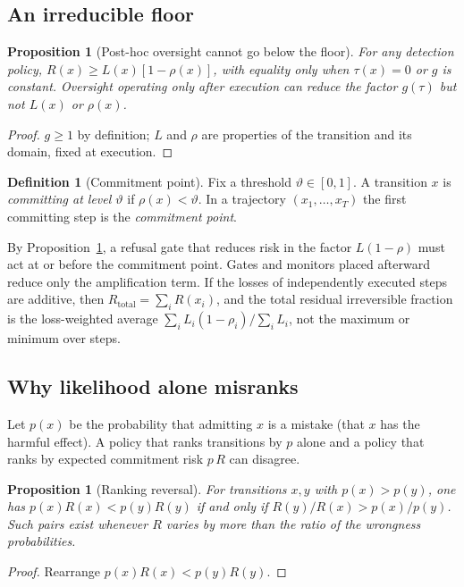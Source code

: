 \documentclass[11pt]{article}
\newtheorem{proposition}[theorem]{Proposition}
\theoremstyle{definition}
\newtheorem{definition}[theorem]{Definition}
\begin{document}
\subsection{An irreducible floor}

\begin{proposition}[Post-hoc oversight cannot go below the floor]\label{prop:D2}
For any detection policy, $R(x)\ge L(x)[1-\rho(x)]$, with equality only when $\tau(x)=0$ or $g$ is constant. Oversight operating only after execution can reduce the factor $g(\tau)$ but not $L(x)$ or $\rho(x)$.
\end{proposition}
\begin{proof}
$g\ge1$ by definition; $L$ and $\rho$ are properties of the transition and its domain, fixed at execution.
\end{proof}

\begin{definition}[Commitment point]
Fix a threshold $\vartheta\in[0,1]$. A transition $x$ is \emph{committing at level $\vartheta$} if $\rho(x)<\vartheta$. In a trajectory $(x_1,\dots,x_T)$ the first committing step is the \emph{commitment point}.
\end{definition}

By Proposition~\ref{prop:D2}, a refusal gate that reduces risk in the factor $L(1-\rho)$ must act at or before the commitment point. Gates and monitors placed afterward reduce only the amplification term. If the losses of independently executed steps are additive, then $R_{\mathrm{total}}=\sum_iR(x_i)$, and the total residual irreversible fraction is the loss-weighted average $\sum_iL_i(1-\rho_i)/\sum_iL_i$, not the maximum or minimum over steps.

\subsection{Why likelihood alone misranks}

Let $p(x)$ be the probability that admitting $x$ is a mistake (that $x$ has the harmful effect). A policy that ranks transitions by $p$ alone and a policy that ranks by expected commitment risk $p\,R$ can disagree.

\begin{proposition}[Ranking reversal]\label{prop:D3}
For transitions $x,y$ with $p(x)>p(y)$, one has $p(x)R(x)<p(y)R(y)$ if and only if $R(y)/R(x)>p(x)/p(y)$. Such pairs exist whenever $R$ varies by more than the ratio of the wrongness probabilities.
\end{proposition}
\begin{proof}
Rearrange $p(x)R(x)<p(y)R(y)$.
\end{proof}
\end{document}
